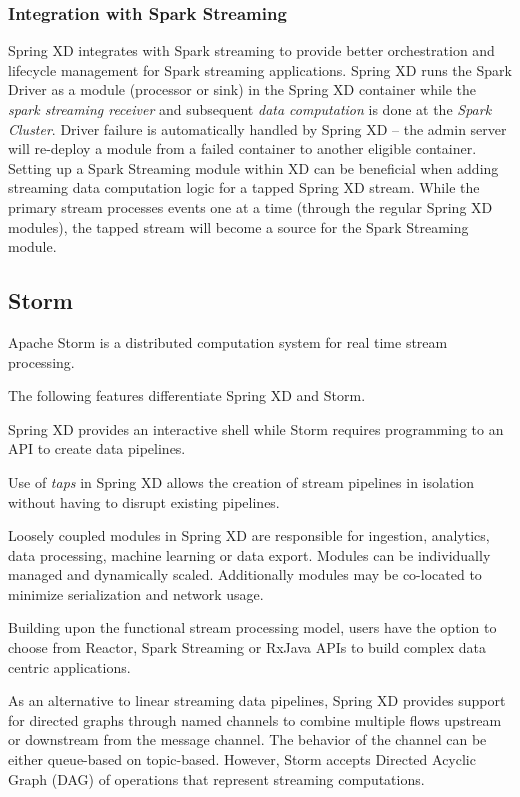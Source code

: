 \subsubsection{Integration with Spark Streaming}
Spring XD integrates with Spark streaming to provide better orchestration and
lifecycle management for Spark streaming applications. Spring XD runs the
Spark Driver as a module (processor or sink) in the Spring XD container
while the \emph{spark streaming receiver} and subsequent \emph{data computation} is
done at the \emph{Spark Cluster}. Driver failure is automatically handled by
Spring XD -- the admin server will re-deploy a module from a failed container
to another eligible container.
Setting up a Spark Streaming module within XD can be beneficial when adding
streaming data computation logic for a tapped Spring XD stream. While the primary
stream processes events one at a time (through the regular Spring XD modules),
the tapped stream will become a source for the Spark Streaming module.

\subsection{Storm}
Apache Storm\cite{storm} is a distributed computation system for real time stream
processing.

The following features differentiate Spring XD and Storm.

\begin{itemize*}
\item Spring XD provides an interactive shell while Storm requires programming
to an API to create data pipelines.
\item Use of \emph{taps} in Spring XD allows the creation of stream pipelines
in isolation without having to disrupt existing pipelines.
\item Loosely coupled modules in Spring XD are responsible for ingestion, analytics,
data processing, machine learning or data export. Modules can be individually managed
and dynamically scaled. Additionally modules may be co-located to minimize
serialization and network usage.
\item Building upon the functional stream processing model, users have the option
to choose from Reactor\cite{reactor}, Spark Streaming or RxJava APIs to build
complex data centric applications.
\item As an alternative to linear streaming data pipelines, Spring XD provides
support for directed graphs through named channels to combine multiple flows
upstream or downstream from the message channel. The behavior of the channel
can be either queue-based on topic-based. However, Storm accepts Directed
Acyclic Graph (DAG)\cite{dag} of operations that represent streaming
computations.
\end{itemize*}

